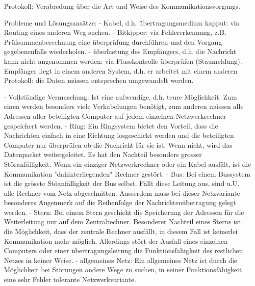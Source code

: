 \begin{answer}
Protokoll: Verabredung über die Art und Weise des Kommunikationsvorgangs.
\end{answer}

\begin{answer}
Probleme und Lösungsansätze:
- Kabel, d.h. übertragungsmedium kapput: via Routing eines anderen Weg suchen.
- Bitkipper: via Fehlererkennung, z.B. Prüfsummenberechnung eine überprüfung durchführen und
den Vorgang gegebenenfalls wiederholen.
- überlastung des Empfängers, d.h. die Nachricht kann nicht angenommen werden: via Flusskontrolle
überprüfen (Staumeldung).
- Empfänger liegt in einem anderen System, d.h. er arbeitet mit einem anderen Protokoll: die
Daten müssen entsprechen umgewandelt werden.
\end{answer}

\begin{answer}
- Vollständige Vermaschung:
Ist eine aufwendige, d.h. teure Möglichkeit. Zum einen werden besonders viele Verkabelungen
benötigt, zum anderen müssen alle Adressen aller beteiligten Computer auf jedem einzelnen Netzwerkrechner
gespeichert werden.
- Ring:
Ein Ringsystem bietet den Vorteil, dass die Nachrichten einfach in eine Richtung losgeschickt
werden und die beteiligten Computer nur überprüfen ob die Nachricht für sie ist. Wenn nicht,
wird das Datenpacket weitergeleitet.
Es hat den Nachteil besonders grosser Störanfälligkeit. Wenn ein einziger Netzwerkrechner oder
ein Kabel ausfält, ist die Kommunikation "dahinterliegenden" Rechner gestört.
- Bus:
Bei einem Bussystem ist die grösste Stöanfälligkeit der Bus selbst. Fällt diese Leitung aus, sind
u.U. alle Rechner vom Netz abgeschnitten. Ausserdem muss bei dieser Netzvariante besonderes
Augenmerk auf die Reihenfolge der Nachrichtenübetragung gelegt werden.
- Stern:
Bei einem Stern geschieht die Speicherung der Adressen für die Weiterleitung nur auf dem Zentralrechner.
Besonderer Nachteil eines Sterns ist die Möglichkeit, dass der zentrale Rechner ausfällt, in
diesem Fall ist keinerlei Kommunikation mehr möglich. Allerdings stört der Ausfall eines einzelnen
Computers oder einer übertragungsleitung die Funktionsfähigkeit des restlichen Netzes in keiner
Weise.
- allgemeines Netz:
Ein allgemeines Netz ist durch die Möglichkeit bei Störungen andere Wege zu suchen, in seiner
Funktionsfähigkeit eine sehr Fehler tolerante Netzwerkvariante.
\end{answer}


